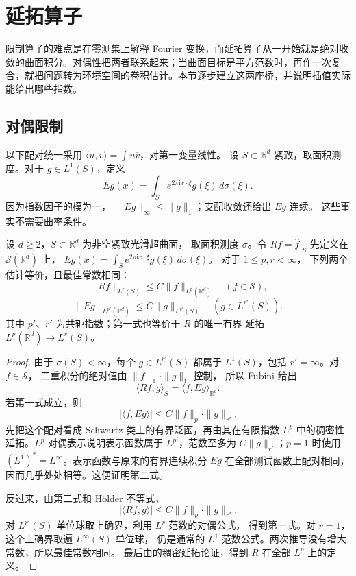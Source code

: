 \section{延拓算子}
\label{b2:sec:2303}

限制算子的难点是在零测集上解释 Fourier 变换，而延拓算子从一开始就是绝对收敛的曲面积分。对偶性把两者联系起来；当曲面目标是平方范数时，再作一次复合，就把问题转为环境空间的卷积估计。本节逐步建立这两座桥，并说明插值实际能给出哪些指数。

\subsection{对偶限制}
\label{b2:subsec:230301}

以下配对统一采用
\(\langle u,v\rangle=\int u\overline v\)，对第一变量线性。
设 \(S\subset\mathbb R^d\) 紧致，取面积测度。对于
\(g\in L^1(S)\)，定义
\[
 Eg(x)=\int_S e^{2\pi\mathrm i x\cdot\xi}g(\xi)\,d\sigma(\xi).
\]
因为指数因子的模为一，
\(\|Eg\|_\infty\leq\|g\|_1\)；支配收敛还给出 \(Eg\) 连续。
这些事实不需要曲率条件。

\begin{proposition}[限制与延拓的对偶]\label{b2:prop:23-duality}
设 \(d\geq2\)，\(S\subset\mathbb R^d\) 为非空紧致光滑超曲面，
取面积测度 \(\sigma\)。令
\(Rf=\widehat f|_S\) 先定义在 \(\mathcal S(\mathbb R^d)\) 上，
\(Eg(x)=\int_S e^{2\pi\mathrm i x\cdot\xi}g(\xi)\,d\sigma(\xi)\)。
对于 \(1\leq p,r<\infty\)，
下列两个估计等价，且最佳常数相同：
\[
 \|Rf\|_{L^r(S)}\leq C\|f\|_{L^p(\mathbb R^d)}
       \quad(f\in\mathcal S),
\]
\[
 \|Eg\|_{L^{p'}(\mathbb R^d)}
       \leq C\|g\|_{L^{r'}(S)}
       \quad(g\in L^{r'}(S)).
\]
其中 \(p'\)、\(r'\) 为共轭指数；第一式也等价于 \(R\) 的唯一有界
延拓 \(L^p(\mathbb R^d)\to L^r(S)\)。
\end{proposition}
\begin{proof}
由于 \(\sigma(S)<\infty\)，每个 \(g\in L^{r'}(S)\) 都属于
\(L^1(S)\)，包括 \(r'= \infty\)。对 \(f\in\mathcal S\)，
二重积分的绝对值由 \(\|f\|_1\cdot\|g\|_1\) 控制，
所以 Fubini 给出
\[
 \langle Rf,g\rangle_{S}
       =\langle f,Eg\rangle_{\mathbb R^d}.
\]
若第一式成立，则
\[
 |\langle f,Eg\rangle|
       \leq C\|f\|_p\cdot\|g\|_{r'}.
\]
先把这个配对看成 Schwartz 类上的有界泛函，再由其在有限指数
\(L^p\) 中的稠密性延拓。\(L^p\) 对偶表示说明表示函数属于
\(L^{p'}\)，范数至多为 \(C\|g\|_{r'}\)；\(p=1\) 时使用
\((L^1)^*=L^\infty\)。表示函数与原来的有界连续积分 \(Eg\)
在全部测试函数上配对相同，因而几乎处处相等。这便证明第二式。

反过来，由第二式和 Hölder 不等式，
\[
 |\langle Rf,g\rangle|
       \leq C\|f\|_p\cdot\|g\|_{r'}.
\]
对 \(L^{r'}(S)\) 单位球取上确界，利用 \(L^r\) 范数的对偶公式，
得到第一式。对 \(r=1\)，这个上确界取遍 \(L^\infty(S)\) 单位球，
仍是通常的 \(L^1\) 范数公式。两次推导没有增大常数，所以最佳常数相同。
最后由的稠密延拓论证，得到 \(R\)
在全部 \(L^p\) 上的定义。
\end{proof}


